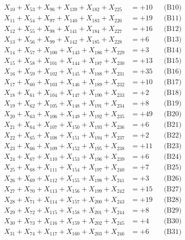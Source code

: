 \documentclass[a4paper,10pt]{article}
\begin{document}
{\begin{align}
X_{10} + X_{53} + X_{96} + X_{139} + X_{182} + X_{225} &= +10 && \text{(B10)} \\
X_{11} + X_{54} + X_{97} + X_{140} + X_{183} + X_{226} &= +19 && \text{(B11)} \\
X_{12} + X_{55} + X_{98} + X_{141} + X_{184} + X_{227} &= +16 && \text{(B12)} \\
X_{13} + X_{56} + X_{99} + X_{142} + X_{185} + X_{228} &= +6 && \text{(B13)} \\
\allowbreak
X_{14} + X_{57} + X_{100} + X_{143} + X_{186} + X_{229} &= +3 && \text{(B14)} \\
X_{15} + X_{58} + X_{101} + X_{144} + X_{187} + X_{230} &= +13 && \text{(B15)} \\
X_{16} + X_{59} + X_{102} + X_{145} + X_{188} + X_{231} &= +35 && \text{(B16)} \\
X_{17} + X_{60} + X_{103} + X_{146} + X_{189} + X_{232} &= +10 && \text{(B17)} \\
X_{18} + X_{61} + X_{104} + X_{147} + X_{190} + X_{233} &= +2 && \text{(B18)} \\
\allowbreak
X_{19} + X_{62} + X_{105} + X_{148} + X_{191} + X_{234} &= +8 && \text{(B19)} \\
X_{20} + X_{63} + X_{106} + X_{149} + X_{192} + X_{235} &= +49 && \text{(B20)} \\
X_{21} + X_{64} + X_{107} + X_{150} + X_{193} + X_{236} &= +6 && \text{(B21)} \\
X_{22} + X_{65} + X_{108} + X_{151} + X_{194} + X_{237} &= +2 && \text{(B22)} \\
X_{23} + X_{66} + X_{109} + X_{152} + X_{195} + X_{238} &= +11 && \text{(B23)} \\
\allowbreak
X_{24} + X_{67} + X_{110} + X_{153} + X_{196} + X_{239} &= +6 && \text{(B24)} \\
X_{25} + X_{68} + X_{111} + X_{154} + X_{197} + X_{240} &= +7 && \text{(B25)} \\
X_{26} + X_{69} + X_{112} + X_{155} + X_{198} + X_{241} &= +3 && \text{(B26)} \\
X_{27} + X_{70} + X_{113} + X_{156} + X_{199} + X_{242} &= +15 && \text{(B27)} \\
X_{28} + X_{71} + X_{114} + X_{157} + X_{200} + X_{243} &= +19 && \text{(B28)} \\
\allowbreak
X_{29} + X_{72} + X_{115} + X_{158} + X_{201} + X_{244} &= +8 && \text{(B29)} \\
X_{30} + X_{73} + X_{116} + X_{159} + X_{202} + X_{245} &= +4 && \text{(B30)} \\
X_{31} + X_{74} + X_{117} + X_{160} + X_{203} + X_{246} &= +6 && \text{(B31)} \\

\end{align}}
\end{document}

